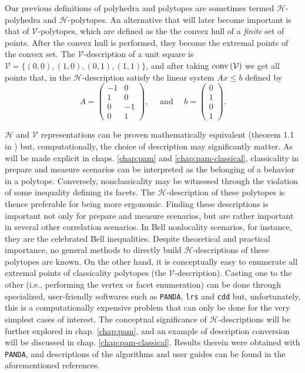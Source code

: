 		Our previous definitions of polyhedra and polytopes are sometimes termed $\mathcal{H}$-polyhedra and $\mathcal{H}$-polytopes. An alternative that will later become important is that of $\mathcal{V}$-polytopes, which are defined as the the convex hull of a \emph{finite} set of points. After the convex hull is performed, they become the extremal points of the convex set. The $\mathcal{V}$-description of a unit square is $\mathcal{V} = \{ (0, 0), (1, 0), (0, 1), (1, 1) \}$, and after taking $\text{conv} \left( \mathcal{V} \right)$ we get all points that, in the $\mathcal{H}$-description satisfy the linear system $Ax \leq b$ defined by 
		$$
			A =
			\begin{pmatrix}
				-1 & 0 \\
				1 & 0 \\
				0 & -1 \\
				0 & 1
			\end{pmatrix},
			\quad\text{ and }\quad
			b =
			\begin{pmatrix}
				0 \\
				1 \\
				0 \\
				1
			\end{pmatrix} .
		$$

		$\mathcal{H}$ and $\mathcal{V}$ representations can be proven mathematically equivalent (theorem 1.1 in \cite{ziegler_lecturespolytopes_1995}) but, computationally, the choice of description may significantly matter. As will be made explicit in chaps. \ref{chap:pam} and \ref{chap:pam-classical}, classicality in prepare and measure scenarios can be interpreted as the belonging of a behavior in a polytope. Conversely, nonclassicality may be witnessed through the violation of some inequality defining its facets. The $\mathcal{H}$-description of these polytopes is thence preferable for being more ergonomic. Finding these descriptions is important not only for prepare and measure scenarios, but are rather important in several other correlation scenarios. In Bell nonlocality scenarios, for instance, they are the celebrated Bell inequalities. Despite theoretical and practical importance, no general methods to directly build $\mathcal{H}$-descriptions of these polytopes are known. On the other hand, it is conceptually easy to enumerate all extremal points of classicality polytopes (the $\mathcal{V}$-description). Casting one to the other (i.e., performing the vertex or facet enumeration) can be done through specialized, user-friendly softwares such as \texttt{PANDA}, \texttt{lrs} and \texttt{cdd} \cite{PANDA,lrs,cdd} but, unfortunately, this is a computationally expensive problem that can only be done for the very simplest cases of interest. The conceptual significance of $\mathcal{H}$-descriptions will be further explored in chap. \ref{chap:pam}, and an example of description conversion will be discussed in chap. \ref{chap:pam-classical}. Results therein were obtained with \texttt{PANDA}, and descriptions of the algorithms and user guides can be found in the aforementioned references.

